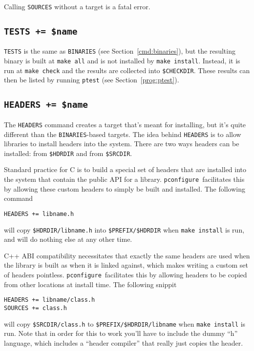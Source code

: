 \documentclass{article}
\newcommand{\pconfigure}{\texttt{pconfigure}}
\begin{document}
Calling \texttt{SOURCES} without a target is a fatal error.

\subsection{\texttt{TESTS += \$name}}

\texttt{TESTS} is the same as \texttt{BINARIES} (see
Section~\ref{cmd:binaries}), but the resulting binary is built at
\texttt{make all} and is not installed by \texttt{make install}.
Instead, it is run at \texttt{make check} and the results are
collected into \texttt{\$CHECKDIR}.  These results can then be listed
by running \texttt{ptest} (see Section~\ref{prog:ptest}).

\subsection{\texttt{HEADERS += \$name}}

The \texttt{HEADERS} command creates a target that's meant for
installing, but it's quite different than the \texttt{BINARIES}-based
targets.  The idea behind \texttt{HEADERS} is to allow libraries to
install headers into the system.  There are two ways headers can be
installed: from \texttt{\$HDRDIR} and from \texttt{\$SRCDIR}.

Standard practice for C is to build a special set of headers that are
installed into the system that contain the public API for a library.
\pconfigure\ facilitates this by allowing these custom headers to
simply be built and installed.  The following command
\begin{verbatim}
HEADERS += libname.h
\end{verbatim}
will copy \texttt{\$HDRDIR/libname.h} into \texttt{\$PREFIX/\$HDRDIR}
when \texttt{make install} is run, and will do nothing else at any
other time.

C++ ABI compatibility necessitates that exactly the same headers are
used when the library is built as when it is linked against, which
makes writing a custom set of headers pointless.
\pconfigure\ facilitates this by allowing headers to be copied from
other locations at install time.  The following snippit
\begin{verbatim}
HEADERS += libname/class.h
SOURCES += class.h
\end{verbatim}
will copy \texttt{\$SRCDIR/class.h} to
\texttt{\$PREFIX/\$HDRDIR/libname} when \texttt{make install} is run.
Note that in order for this to work you'll have to include the dummy
``h'' language, which includes a ``header compiler'' that really just
copies the header.
\end{document}
